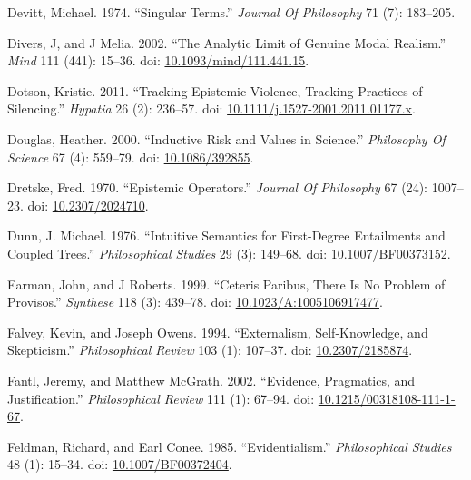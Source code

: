 \documentclass[
  10pt,
  letterpaper,
  DIV=11,
  numbers=noendperiod,
  twoside]{scrartcl}
\newlength{\cslhangindent}
\newenvironment{CSLReferences}[2] %
 {\begin{list}{}{%
  \setlength{\itemindent}{0pt}
  \setlength{\leftmargin}{0pt}
  \setlength{\parsep}{0pt}
  \ifodd #1
   \setlength{\leftmargin}{\cslhangindent}
   \setlength{\itemindent}{-1\cslhangindent}
  \fi
  \setlength{\itemsep}{#2\baselineskip}}}
 {\end{list}}
\begin{document}
\begin{CSLReferences}{1}{0}
Devitt, Michael. 1974. {``Singular Terms.''} \emph{Journal Of
Philosophy} 71 (7): 183--205.

Divers, J, and J Melia. 2002. {``The Analytic Limit of Genuine Modal
Realism.''} \emph{Mind} 111 (441): 15--36. doi:
\href{https://doi.org/10.1093/mind/111.441.15}{10.1093/mind/111.441.15}.

Dotson, Kristie. 2011. {``Tracking Epistemic Violence, Tracking
Practices of Silencing.''} \emph{Hypatia} 26 (2): 236--57. doi:
\href{https://doi.org/10.1111/j.1527-2001.2011.01177.x}{10.1111/j.1527-2001.2011.01177.x}.

Douglas, Heather. 2000. {``Inductive Risk and Values in Science.''}
\emph{Philosophy Of Science} 67 (4): 559--79. doi:
\href{https://doi.org/10.1086/392855}{10.1086/392855}.

Dretske, Fred. 1970. {``Epistemic Operators.''} \emph{Journal Of
Philosophy} 67 (24): 1007--23. doi:
\href{https://doi.org/10.2307/2024710}{10.2307/2024710}.

Dunn, J. Michael. 1976. {``Intuitive Semantics for First-Degree
Entailments and Coupled Trees.''} \emph{Philosophical Studies} 29 (3):
149--68. doi:
\href{https://doi.org/10.1007/BF00373152}{10.1007/BF00373152}.

Earman, John, and J Roberts. 1999. {``Ceteris Paribus, There Is No
Problem of Provisos.''} \emph{Synthese} 118 (3): 439--78. doi:
\href{https://doi.org/10.1023/A:1005106917477}{10.1023/A:1005106917477}.

Falvey, Kevin, and Joseph Owens. 1994. {``Externalism, Self-Knowledge,
and Skepticism.''} \emph{Philosophical Review} 103 (1): 107--37. doi:
\href{https://doi.org/10.2307/2185874}{10.2307/2185874}.

Fantl, Jeremy, and Matthew McGrath. 2002. {``Evidence, Pragmatics, and
Justification.''} \emph{Philosophical Review} 111 (1): 67--94. doi:
\href{https://doi.org/10.1215/00318108-111-1-67}{10.1215/00318108-111-1-67}.

Feldman, Richard, and Earl Conee. 1985. {``Evidentialism.''}
\emph{Philosophical Studies} 48 (1): 15--34. doi:
\href{https://doi.org/10.1007/BF00372404}{10.1007/BF00372404}.


\end{CSLReferences}
\end{document}
